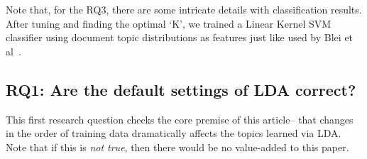 \documentclass[twocolumn,5p,sort&compress]{elsarticle}
\theoremstyle{break}
\begin{document}
  Note that, for the RQ3, there are some intricate details with classification results. After tuning and finding the optimal `K', we trained a Linear Kernel SVM classifier using document topic distributions as features just like used by Blei et al~\cite{blei2003latent}.


\subsection{\textbf{RQ1: Are the default settings of LDA correct?}}\label{sect:unstable}


This first research question checks the core premise of this article-- that changes
in the order of training data dramatically affects the topics learned via LDA.
Note that if this is {\em not true}, then there would be no value-added to this paper.
\end{document}
